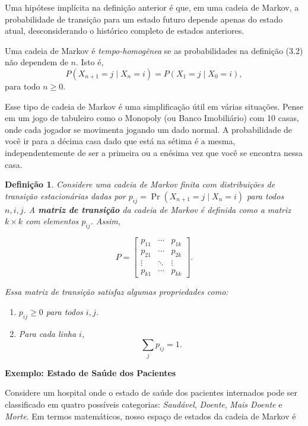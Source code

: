 \documentclass[12pt]{article}
\theoremstyle{break}
\newtheorem{definition}{Definição}[section]
\begin{document}
Uma hipótese implícita na definição anterior é que, em uma cadeia de Markov, a probabilidade de transição para um estado futuro depende apenas do estado atual, desconsiderando o histórico completo de estados anteriores.




Uma cadeia de Markov é \textit{tempo-homogênea} se as probabilidades na definição (3.2) não dependem de \( n \). Isto é,
\[
P(X_{n+1} = j \mid X_n = i) = P(X_1 = j \mid X_0 = i),
\]
para todo \( n \geq 0 \). 

Esse tipo de cadeia de Markov é uma simplificação útil em várias situações. Pense em um jogo de tabuleiro como o Monopoly (ou Banco Imobiliário) com 10 casas, onde cada jogador se movimenta jogando um dado normal. A probabilidade de você ir para a décima casa dado que está na sétima é a mesma, independentemente de ser a primeira ou a enésima vez que você se encontra nessa casa.





\begin{definition}{}

Considere uma cadeia de Markov finita com distribuições de transição estacionárias dadas por \( p_{ij} = \Pr(X_{n+1} = j \mid X_n = i) \) para todos \( n, i, j \). A \textbf{matriz de transição} da cadeia de Markov é definida como a matriz \( k \times k \) com elementos \( p_{ij} \). Assim,

\[
P = \begin{bmatrix}
p_{11} & \cdots & p_{1k} \\
p_{21} & \cdots & p_{2k} \\
\vdots & \ddots & \vdots \\
p_{k1} & \cdots & p_{kk}
\end{bmatrix}.
\]


Essa matriz de transição satisfaz algumas propriedades como:
\begin{enumerate}
    \item \( p_{ij} \geq 0 \) para todos \( i, j \).
    \item Para cada linha \( i \),
    \[
    \sum_j p_{ij} = 1.
    \]
\end{enumerate}
\end{definition}




\textbf{Exemplo: Estado de Saúde dos Pacientes}



Considere um hospital onde o estado de saúde dos pacientes internados pode ser classificado em quatro possíveis categorias: \textit{Saudável}, \textit{Doente}, \textit{Mais Doente} e \textit{Morte}. Em termos matemáticos, nosso espaço de estados da cadeia de Markov é
\end{document}
